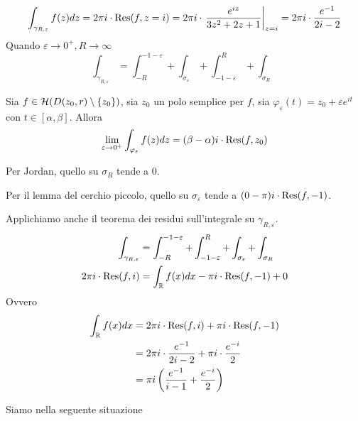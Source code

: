 \begin{equation*}
\int _{\gamma _{R,\varepsilon }} f(z)dz = 2\pi i\cdot \operatorname{Res}  (f,z = i) = 2\pi i\cdot \left. \frac{e^{iz}}{3z^{2} + 2z + 1}\right| _{z = i} = 2\pi i\cdot \frac{e^{ - 1}}{2i - 2}
\end{equation*}
Quando $\varepsilon \rightarrow 0^{ + } ,R\rightarrow \infty $
\begin{equation*}
\int _{\gamma _{R,\varepsilon }} = \int ^{ - 1 - \varepsilon }_{ - R} + \int _{\sigma _{\varepsilon }} + \int ^{R}_{ - 1 - \varepsilon } + \int _{\sigma _{R}}
\end{equation*}
\begin{thm}
 Sia $f\in \mathcal{H} (D(z_{0} ,r) \setminus \{z_{0}\})$, sia $z_{0}$ un polo semplice per $f$, sia $\varphi _{\varepsilon }(t) = z_{0} + \varepsilon e^{it}$ con $t\in [ \alpha ,\beta ]$. Allora
\begin{equation*}
\lim _{\varepsilon \rightarrow 0^{ + }}\int _{\varphi _{\varepsilon }} f(z) dz = (\beta - \alpha) i\cdot \operatorname{Res} (f,z_{0})
\end{equation*}
\end{thm}
Per Jordan, quello su $\sigma _{R}$ tende a $0$.

Per il lemma del cerchio piccolo, quello su $\sigma _{\varepsilon }$ tende a $(0 - \pi) i\cdot \operatorname{Res} (f, - 1)$.

Applichiamo anche il teorema dei residui sull'integrale su $\gamma _{R,\varepsilon }$.
\begin{equation*}
\begin{aligned}
\int _{\gamma _{R,\varepsilon }} & = \int ^{ - 1 - \varepsilon }_{ - R} + \int ^{R}_{ - 1 - \varepsilon } + \int _{\sigma _{\varepsilon }} + \int _{\sigma _{R}}\\
2\pi i\cdot \operatorname{Res}  (f,i) & = \int _{\mathbb{R} } f(x) dx - \pi i\cdot \operatorname{Res} (f, - 1) + 0
\end{aligned}
\end{equation*}
Ovvero
\begin{equation*}
\begin{aligned}
\int _{\mathbb{R} } f(x) dx & = 2\pi i\cdot \operatorname{Res}  (f,i) + \pi i\cdot \operatorname{Res} (f, - 1)\\
 & = 2\pi i\cdot \frac{e^{ - 1}}{2i - 2} + \pi i\cdot \frac{e^{ - i}}{2}\\
 & = \pi i\left(\frac{e^{ - 1}}{i - 1} + \frac{e^{ - i}}{2}\right)
\end{aligned}
\end{equation*}
\Soluzione

Siamo nella seguente situazione


